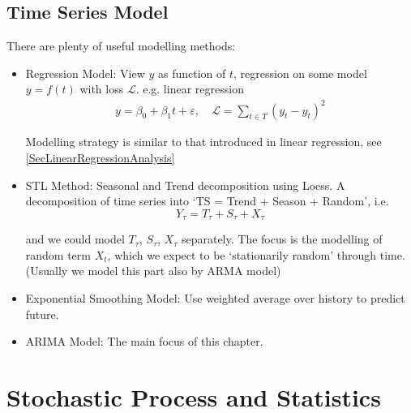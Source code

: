 \subsection{Time Series Model}
    There are plenty of useful modelling methods:
    \begin{itemize}[topsep=2pt,itemsep=0pt]
        \item Regression Model: View $ y $ as function of $ t $, regression on some model $ y=f(t) $ with loss $ \mathcal{L} $. e.g. linear regression
        \begin{align}
            y=\beta _0+\beta _1t+\varepsilon ,\quad \mathcal{L}=\sum_{t\in T}(y_t-\hat{y}_t)^2 
        \end{align}
        
        Modelling strategy is similar to that introduced in linear regression, see \autoref{SecLinearRegressionAnalysis} 
        
        \item STL Method: Seasonal and Trend decomposition using Loess. A decomposition of time series into `TS = Trend + Season + Random', i.e.
        \begin{equation}
            Y_\tau=T_\tau+S_\tau+X_\tau 
        \end{equation}
    
        and we could model $ T_\tau $, $ S_{\tau} $, $ X_\tau $ separately. The focus is the modelling of random term $ X_t $, which we expect to be `stationarily random' through time. (Usually we model this part also by ARMA model)

        \item Exponential Smoothing Model: Use weighted average over history to predict future.

        \item ARIMA Model: The main focus of this chapter.
    \end{itemize}
    






\section{Stochastic Process and Statistics}\label{SubSectionStochasticProcessForTimeSeries}
